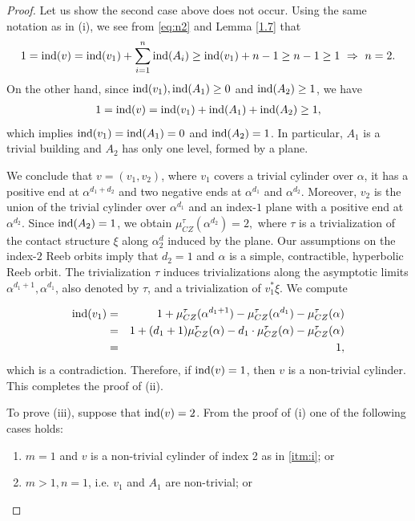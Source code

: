 \documentclass{amsart}
\newcommand{\CZ}{\mu_{CZ}^{\tau}}
\newcommand{\ind}{\textnormal{ind}}
\begin{document}
\begin{proof}
Let us show the second case above does not occur. Using the same notation as in (i), we see from  \eqref{eq:n2} and  Lemma \ref{1.7} that
$$1=\ind(v)= \ind(v_1) + \sum_{i=1}^n \ind(A_i) \geq \ind(v_1)+n-1 \geq n-1 \geq 1 \, \, \Rightarrow \,\, n=2.$$
On the other hand, since $\ind(v_1),\ind(A_1)\geq 0$ and $\ind(A_2)\geq 1$, we have
\begin{eqnarray}
1=\ind(v) =\ind(v_1)+\ind(A_1)+\ind(A_2) \geq 1, 
\end{eqnarray}
which implies 
$\ind(v_1)=\ind(A_1)=0$ and $\ind(A_2)=1$. 
In particular, $A_1$ is a trivial building and $A_2$ has only one level,  formed by a plane.

We conclude that  $v=(v_1,v_2)$, where $v_1$ covers a trivial cylinder over $\alpha$, it has a positive end at $\alpha^{d_1+d_2}$ and two negative ends at $\alpha^{d_1}$ and $\alpha^{d_2 }$. Moreover, $v_2$ is the union of the trivial cylinder over $\alpha^{d_1}$ and an index-$1$ plane  with a positive end at $\alpha^{d_2}$. Since $\ind(A_2) = 1$, we obtain $\mu_{CZ}^\tau(\alpha^{d_2})=2,$ where $\tau$ is a trivialization of the contact structure $\xi$ along $\alpha^d_2$ induced by the plane. Our assumptions on the index-$2$ Reeb orbits imply that $d_2=1$ and $\alpha$ is a simple, contractible, hyperbolic Reeb orbit. The trivialization $\tau$ induces trivializations along the asymptotic limits $\alpha^{d_1+1},\alpha^{d_1}$, also denoted by $\tau$, and a trivialization of $v_1^*\xi$. We compute


\begin{eqnarray*}
\ind(v_1) &=& 1+\CZ(\alpha^{d_1+1})-\CZ(\alpha^{d_1})-\CZ(\alpha)\\
&=& 1 + (d_1+1)\mu^{\tau}_{CZ}(\alpha)-d_1 \cdot \mu^{\tau}_{CZ}(\alpha)-  \mu^{\tau}_{CZ}(\alpha)\\
&=& 1,
\end{eqnarray*}
which is a contradiction. Therefore, if $\ind(v)=1$, then $v$ is a non-trivial cylinder. This completes the proof of (ii).

To prove (iii), suppose that $\ind(v)=2$. From the proof of (i) one of the following cases holds:

\begin{enumerate}

\item $m=1$ and $v$ is a non-trivial cylinder of index 2 as in \ref{itm:i}; or

\item $m>1, n=1$, i.e. $v_1$ and $A_1$ are non-trivial; or


\end{enumerate}
\end{proof}
\end{document}
